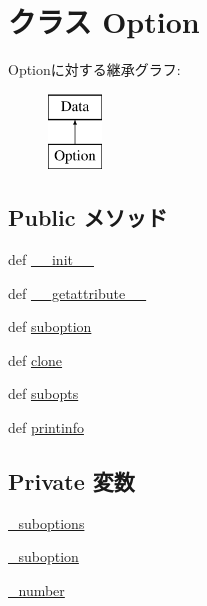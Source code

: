 \hypertarget{classm5_1_1util_1_1jobfile_1_1Option}{
\section{クラス Option}
\label{classm5_1_1util_1_1jobfile_1_1Option}
}
Optionに対する継承グラフ:\begin{figure}[H]
\begin{center}
\leavevmode
\includegraphics[height=2cm]{classm5_1_1util_1_1jobfile_1_1Option}
\end{center}
\end{figure}
\subsection*{Public メソッド}
\begin{DoxyCompactItemize}
\item 
def \hyperlink{classm5_1_1util_1_1jobfile_1_1Option_ac775ee34451fdfa742b318538164070e}{\_\-\_\-init\_\-\_\-}
\item 
def \hyperlink{classm5_1_1util_1_1jobfile_1_1Option_a21a3b336c73a0520c5bcb16ec9c94e38}{\_\-\_\-getattribute\_\-\_\-}
\item 
def \hyperlink{classm5_1_1util_1_1jobfile_1_1Option_ae08e10a2c78f3252cacf63af0ba9f9e5}{suboption}
\item 
def \hyperlink{classm5_1_1util_1_1jobfile_1_1Option_a4110248fff184e40b53c1cfa2bc3c649}{clone}
\item 
def \hyperlink{classm5_1_1util_1_1jobfile_1_1Option_a5f5171e812f65a70d0876081203f320f}{subopts}
\item 
def \hyperlink{classm5_1_1util_1_1jobfile_1_1Option_a40bc1aa85be1c4ba18cd144234c53984}{printinfo}
\end{DoxyCompactItemize}
\subsection*{Private 変数}
\begin{DoxyCompactItemize}
\item 
\hyperlink{classm5_1_1util_1_1jobfile_1_1Option_aaf21036f50eaaea78af5a677b13e3f62}{\_\-suboptions}
\item 
\hyperlink{classm5_1_1util_1_1jobfile_1_1Option_a991c1f3b6d9144a79d4e8c980f7da390}{\_\-suboption}
\item 
\hyperlink{classm5_1_1util_1_1jobfile_1_1Option_a323644ffc835b0fba1e3e75e7ee48903}{\_\-number}
\end{DoxyCompactItemize}


